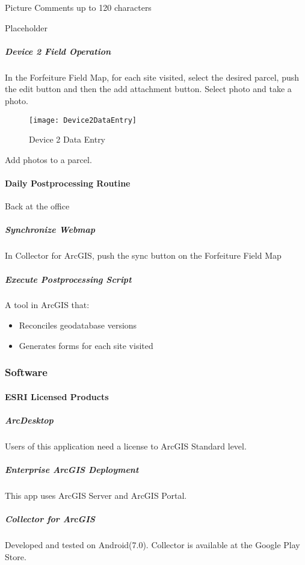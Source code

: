 \documentclass[class=article , crop=false, titlepage, twoside, multi={itemize, figure, verbatim}, float=false]{standalone}
\begin{document}
\noindent Picture Comments up to 120 characters\\
\vspace{3in}

\noindent Placeholder\\

\clearpage
\subparagraph{Device 2 Field Operation} 
\subparagraph*{}In the Forfeiture Field Map, for each site visited, select the desired parcel, push the edit button and then the add attachment button.  Select photo and take a photo.

\begin{wrapfigure}{l}{0.5\textwidth}
\centering
\texttt{[image: Device2DataEntry]}
\caption {Device 2 Data Entry}
\end{wrapfigure}
\vspace{1in}

Add photos to a parcel.

\clearpage
\paragraph{Daily Postprocessing Routine}Back at the office
\subparagraph{Synchronize Webmap}In Collector for ArcGIS, push the sync button on the Forfeiture Field Map
\subparagraph{Execute Postprocessing Script}A tool in ArcGIS that:

\begin{itemize}
\item Reconciles geodatabase versions
\item Generates forms for each site visited


\end{itemize}

\clearpage
\subsubsection{Software}
\paragraph{ESRI Licensed Products}
\subparagraph{ArcDesktop}Users of this application need a license to ArcGIS Standard level.

\subparagraph{Enterprise ArcGIS Deployment}This app uses ArcGIS Server and ArcGIS Portal.

\subparagraph{Collector for ArcGIS}Developed and tested on Android(7.0).  Collector is available at the Google Play Store.
\end{document}
